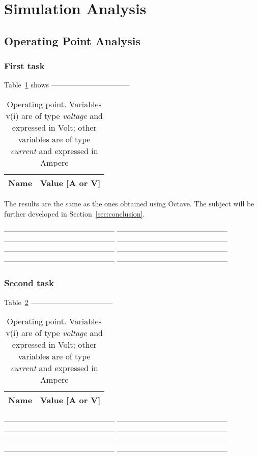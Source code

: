 \section{Simulation Analysis}
\label{sec:simulation}

\subsection{Operating Point Analysis}

\subsubsection{First task}

Table~\ref{tab:op1} shows ---------------------------------

\begin{table}[H]
  \centering
  \begin{tabular}{|l|r|}
    \hline    
    {\bf Name} & {\bf Value [A or V]} \\ \hline
    
  \end{tabular}
  \caption{Operating point. Variables v(i) are of type {\it voltage} and expressed in
    Volt; other variables are of type {\it current} and expressed in Ampere}
  \label{tab:op1}
\end{table}

The results are the same as the ones obtained using Octave. The subject will be further developed in Section~\ref{sec:conclusion}.

-----------------------------------------------
-----------------------------------------------
-----------------------------------------------
-----------------------------------------------
-----------------------------------------------
-----------------------------------------------
-----------------------------------------------
-----------------------------------------------

\subsubsection{Second task}

Table~\ref{tab:op2} ----------------------------------- 

\begin{table}[H]
  \centering
  \begin{tabular}{|l|r|}
    \hline    
    {\bf Name} & {\bf Value [A or V]} \\ \hline
    
  \end{tabular}
  \caption{Operating point. Variables v(i) are of type {\it voltage} and expressed in
    Volt; other variables are of type {\it current} and expressed in Ampere}
  \label{tab:op2}
\end{table}

-----------------------------------------------
-----------------------------------------------
-----------------------------------------------
-----------------------------------------------
-----------------------------------------------
-----------------------------------------------
-----------------------------------------------
-----------------------------------------------

